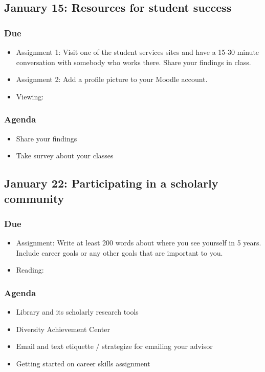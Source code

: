 \documentclass[12pt,article,oneside]{memoir}
\begin{document}
\subsection{January 15: Resources for student success}
\subsubsection{Due}
\begin{itemize}
 \item Assignment 1: Visit one of the student services sites and have a 15-30 minute conversation with somebody who works there.  Share your findings in class.
 \item Assignment 2: Add a profile picture to your Moodle account.
 \item Viewing: \cite{tannahill} 
\end{itemize}
\subsubsection{Agenda}
\begin{itemize}
\item Share your findings
\item Take survey about your classes
\end{itemize} 








\subsection{January 22: Participating in a scholarly community}
\subsubsection{Due}
\begin{itemize}
 \item Assignment: Write at least 200 words about where you see yourself in 5 years.  Include career goals or any other goals that are important to you.
 \item Reading: \cite{wellsley}
\end{itemize}


\subsubsection{Agenda}
\begin{itemize}
 \item Library and its scholarly research tools
 \item Diversity Achievement Center
 \item Email and text etiquette / strategize for emailing your advisor
 \item Getting started on career skills assignment
\end{itemize}
\end{document}
